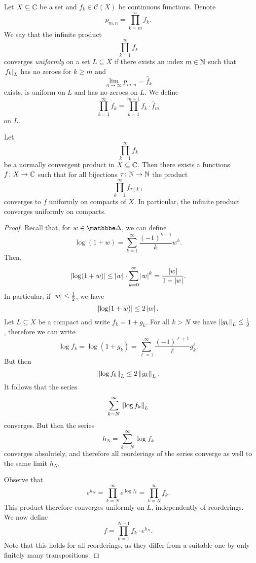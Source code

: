 \begin{definicija}
Let $X \subseteq \mathbb{C}$ be a set and $f_k \in \mathcal{C}(X)$ be
continuous functions. Denote
\[
p_{m,n} = \prod_{k=m}^n f_k.
\]
We say that the infinite product
\[
\prod_{k=1}^\infty f_k
\]
converges \emph{uniformly} on a set
$L \subseteq X$ if there exists an index $m \in \mathbb{N}$ such that
$\left. f_k\right|_{L}^{}$ has no zeroes for $k \geq m$ and
\[
\lim_{n \to \infty} p_{m,n} = \widehat{f}_k
\]
exists, is uniform on $L$ and has no zeroes on $L$. We define
\[
\prod_{k=1}^\infty f_k = \prod_{k=1}^{m-1} f_k \cdot \widehat{f}_m
\]
on $L$.
\end{definicija}

\begin{izrek}
Let
\[
\prod_{k=1}^\infty f_k
\]
be a normally convergent product in $X \subseteq \mathbb{C}$. Then there
exists a functions $f \colon X \to \mathbb{C}$ such that for all bijections
$\tau \colon \mathbb{N} \to \mathbb{N}$ the product
\[
\prod_{k=1}^\infty f_{\tau(k)}
\]
converges to $f$ uniformly on compacts of $X$. In particular, the
infinite product converges uniformly on compacts.
\end{izrek}

\begin{proof}
Recall that, for $w \in \dsk$, we can define
\[
\log(1+w) = \sum_{k=1}^\infty \frac{(-1)^{k+1}}{k} w^k.
\]
Then,
\[
\left\lvert \log(1+w)\right\rvert \leq
\left\lvert w\right\rvert \cdot \sum_{k=0}^\infty \left\lvert w\right\rvert^k =
\frac{\left\lvert w\right\rvert}{1 - \left\lvert w\right\rvert}.
\]
In particular, if $\left\lvert w\right\rvert \leq \frac{1}{2}$, we have
\[
\left\lvert \log(1+w)\right\rvert \leq 2 \left\lvert w\right\rvert.
\]
Let $L \subseteq X$ be a compact and write $f_k = 1 + g_k$. For
all $k > N$ we have $\left\lVert g_k\right\rVert_L \leq \frac{1}{2}$, therefore we
can write
\[
\log f_k =
\log(1 + g_k) =
\sum_{\ell=1}^\infty \frac{(-1)^{\ell+1}}{\ell} g_k^\ell.
\]
But then
\[
\left\lVert \log f_k\right\rVert_L \leq 2 \left\lVert g_k\right\rVert_L.
\]
It follows that the series
\[
\sum_{k=N}^\infty \left\lVert \log f_k\right\rVert_L
\]
converges. But then the series
\[
h_N = \sum_{k=N}^\infty \log f_k
\]
converges absolutely, and therefore all reorderings of the series
converge as well to the same limit $h_N$.

Observe that
\[
e^{h_N} = \prod_{k=N}^\infty e^{\log f_k} = \prod_{k=N}^\infty f_k.
\]
This product therefore converges uniformly on $L$, independently of
reorderings. We now define
\[
f = \prod_{k=1}^{N-1} f_k \cdot e^{h_N}.
\]
Note that this holds for all reorderings, as they differ from a
suitable one by only finitely many transpositions.
\end{proof}
